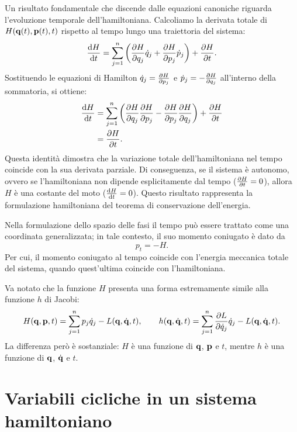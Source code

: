 Un risultato fondamentale che discende dalle equazioni canoniche riguarda l'evoluzione temporale dell'hamiltoniana. Calcoliamo la derivata totale di $H(\vb{q}(t), \vb{p}(t), t)$ rispetto al tempo lungo una traiettoria del sistema:
\begin{equation*}
    \dv{H}{t} = \sum_{j=1}^n \left( \pdv{H}{q_j} \dot{q}_j + \pdv{H}{p_j} \dot{p}_j \right) + \pdv{H}{t}.
\end{equation*}
Sostituendo le equazioni di Hamilton $\dot{q}_j = \pdv{H}{p_j}$ e $\dot{p}_j = -\pdv{H}{q_j}$ all'interno della sommatoria, si ottiene:
\begin{align*}
    \dv{H}{t} &= \sum_{j=1}^n \left( \pdv{H}{q_j} \pdv{H}{p_j} - \pdv{H}{p_j} \pdv{H}{q_j} \right) + \pdv{H}{t} \\
    &= \pdv{H}{t}.
\end{align*}
Questa identità dimostra che la variazione totale dell'hamiltoniana nel tempo coincide con la sua derivata parziale. Di conseguenza, se il sistema è autonomo, ovvero se l'hamiltoniana non dipende esplicitamente dal tempo ($\pdv{H}{t} = 0$), allora $H$ è una costante del moto ($\dv{H}{t} = 0$). Questo risultato rappresenta la formulazione hamiltoniana del teorema di conservazione dell'energia.

\begin{remark}
    Nella formulazione dello spazio delle fasi il tempo può essere trattato come una coordinata generalizzata; in tale contesto, il suo momento coniugato è dato da
    \begin{equation*}
        p_t = - H.
    \end{equation*}
    Per cui, il momento coniugato al tempo coincide con l'energia meccanica totale del sistema, quando quest'ultima coincide con l'hamiltoniana.
\end{remark}

Va notato che la funzione $H$ presenta una forma estremamente simile alla funzione $h$ di Jacobi:
\begin{equation*}
    H(\vb{q}, \vb{p}, t) = \sum_{j=1}^n p_j \dot{q}_j - L(\vb{q}, \dot{\vb{q}}, t), \qquad h(\vb{q}, \dot{\vb{q}}, t) = \sum_{j=1}^n \pdv{L}{\dot{q}_j} \dot{q}_j - L(\vb{q}, \dot{\vb{q}}, t).
\end{equation*}
La differenza però è sostanziale: $H$ è una funzione di $\vb{q}$, $\vb{p}$ e $t$, mentre $h$ è una funzione di $\vb{q}$, $\dot{\vb{q}}$ e $t$.

\section{Variabili cicliche in un sistema hamiltoniano}

